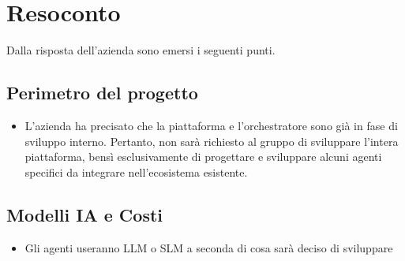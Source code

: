 \section{Resoconto}
Dalla risposta dell'azienda sono emersi i seguenti punti.

\subsection{Perimetro del progetto}
\begin{itemize}
	\item L'azienda ha precisato che la piattaforma e l'orchestratore sono già in fase di sviluppo interno. Pertanto, non sarà richiesto al gruppo di sviluppare l'intera piattaforma, bensì esclusivamente di progettare e sviluppare alcuni agenti specifici da integrare nell'ecosistema esistente.
\end{itemize}

\subsection{Modelli IA e Costi}
\begin{itemize}
	\item Gli agenti useranno LLM o SLM a seconda di cosa sarà deciso di sviluppare
\end{itemize}

